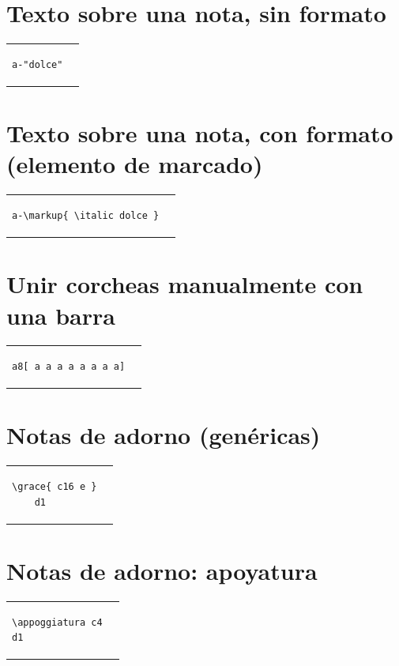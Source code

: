 \documentclass[10pt,a4paper,oneside,headinclude,titlepage]{scrartcl}
\begin{document}
\section*{Texto sobre una nota, sin formato}
\begin{tabular}{m{3cm}m{2cm}}
\begin{verbatim}
a-"dolce"
\end{verbatim}
&
\begin[fragment,notime]{lilypond}
a-"dolce"
\end{lilypond}
\end{tabular}

\section*{Texto sobre una nota, con formato (elemento de marcado)}
\begin{tabular}{m{6cm}m{2cm}}
\begin{verbatim}
a-\markup{ \italic dolce }
\end{verbatim}
&
\begin[fragment,notime]{lilypond}
a-\markup{ \italic dolce }
\end{lilypond}
\end{tabular}

\section*{Unir corcheas manualmente con una barra}
\begin{tabular}{m{6cm}m{2cm}}
\begin{verbatim}
a8[ a a a a a a a a]
\end{verbatim}
&
\begin[fragment]{lilypond}
a8[ a a a a a a a a]
\end{lilypond}
\end{tabular}

\section*{Notas de adorno (genéricas)}
\begin{tabular}{m{6cm}m{2cm}}
\begin{verbatim}
\grace{ c16 e }
    d1
\end{verbatim}
&
\begin[fragment,relative=1]{lilypond}
\grace{ c16 e }
    d1
\end{lilypond}
\end{tabular}

\section*{Notas de adorno: apoyatura}
\begin{tabular}{m{6cm}m{2cm}}
\begin{verbatim}
\appoggiatura c4
d1
\end{verbatim}
&
\begin[fragment,relative=1]{lilypond}
\appoggiatura c4
d1
\end{lilypond}
\end{tabular}
\end{document}
